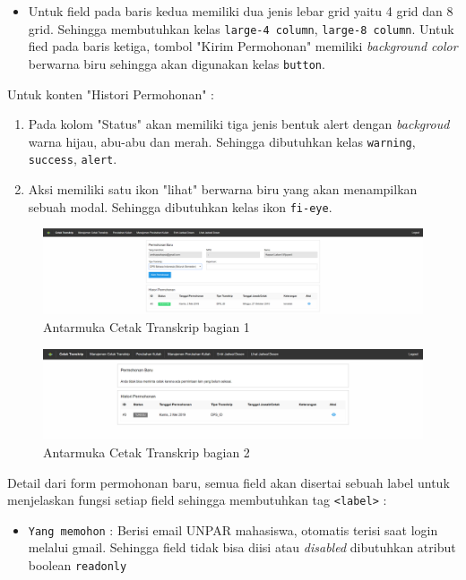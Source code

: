 \documentclass[a4paper,twoside]{article}
\begin{document}
\begin{enumerate}
\begin{itemize}
			\item Untuk field pada baris kedua memiliki dua jenis lebar grid yaitu 4 grid dan 8 grid. Sehingga membutuhkan kelas \verb|large-4 column|, \verb|large-8 column|. Untuk fied pada baris ketiga, tombol "Kirim Permohonan" memiliki \textit{background color} berwarna biru sehingga akan digunakan kelas \verb|button|.
		\end{itemize}
		Untuk konten "Histori Permohonan" :
		\begin{enumerate}	
			\item Pada kolom "Status" akan memiliki tiga jenis bentuk alert dengan \textit{backgroud} warna hijau, abu-abu dan merah. Sehingga dibutuhkan kelas \verb|warning|, \verb|success|, \verb|alert|.
			\item Aksi memiliki satu ikon "lihat" berwarna biru yang akan menampilkan sebuah modal. Sehingga dibutuhkan kelas ikon \verb|fi-eye|.
		\end{enumerate}
		\begin{figure} [H]
			\centering  
			\includegraphics[scale=0.5]{Tampilan-Mahasiswa-Cetak-Transkrip.png}  
			\caption{Antarmuka Cetak Transkrip bagian 1} 
		\end{figure}
		\begin{figure} [H]
			\centering  
			\includegraphics[scale=0.5]{Tampilan-Cetak-Transkrip.png}  
			\caption{Antarmuka Cetak Transkrip bagian 2} 
		\end{figure}
		Detail dari form permohonan baru, semua field akan disertai sebuah label untuk menjelaskan fungsi setiap field sehingga membutuhkan tag \texttt{<label>}  :
		\begin{itemize}	
			\item \texttt{Yang memohon} : Berisi email UNPAR mahasiswa, otomatis terisi saat login melalui gmail. Sehingga field tidak bisa diisi atau \textit{disabled} dibutuhkan atribut boolean \verb|readonly|

\end{itemize}
\end{enumerate}
\end{document}

